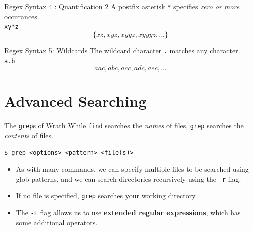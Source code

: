 \documentclass[11pt]{beamer}
\begin{document}
\begin{frame}{Regex Syntax 4 : Quantification 2}
\center
A postfix asterisk \texttt{\**} specifies \emph{zero or more} occurances. \\ 
\texttt{xy*z}
$$ \{ xz, xyz, xyyz, xyyyz, ... \} $$
\end{frame}

\begin{frame}{Regex Syntax 5: Wildcards}
\center
The wildcard character \texttt{.} matches any character. \\
\texttt{a.b}
$$ {aac, abc, acc, adc, aec, ...} $$
\end{frame}

\section[Grep]{Advanced Searching}
\begin{frame}[fragile=singleslide]{The \texttt{grep}s of Wrath}
While \texttt{find} searches the \emph{names} of files, \texttt{grep} searches the \emph{contents} of files. 
\begin{lstlisting}[style=terminal]
$ grep <options> <pattern> <file(s)>
\end{lstlisting}
\begin{itemize}
\item As with many commands, we can specify multiple files to be searched using glob patterns, and we can search directories recursively using the \texttt{-r} flag.
\item If no file is specified, \texttt{grep} searches your working directory.  
\item The \texttt{-E} flag allows us to use \textbf{extended regular expressions}, which has some additional operators. 
\end{itemize}
\end{frame}
\end{document}
